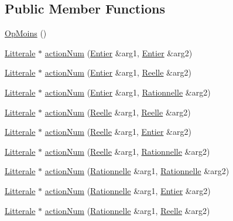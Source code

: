 \subsection*{Public Member Functions}
\begin{DoxyCompactItemize}
\item 
\hyperlink{class_op_moins_a0220e5295f19be91875616b52d28453d}{Op\+Moins} ()
\item 
\hyperlink{class_litterale}{Litterale} $\ast$ \hyperlink{class_op_moins_a852637df56ddd5a98212559db77d0ed0}{action\+Num} (\hyperlink{class_entier}{Entier} \&arg1, \hyperlink{class_entier}{Entier} \&arg2)
\item 
\hyperlink{class_litterale}{Litterale} $\ast$ \hyperlink{class_op_moins_ab478b2dc55902bdad80ea811779d8466}{action\+Num} (\hyperlink{class_entier}{Entier} \&arg1, \hyperlink{class_reelle}{Reelle} \&arg2)
\item 
\hyperlink{class_litterale}{Litterale} $\ast$ \hyperlink{class_op_moins_a03336a72ebbbb55322ba4328affc56c6}{action\+Num} (\hyperlink{class_entier}{Entier} \&arg1, \hyperlink{class_rationnelle}{Rationnelle} \&arg2)
\item 
\hyperlink{class_litterale}{Litterale} $\ast$ \hyperlink{class_op_moins_a1673d5e6a39a07dc7ba20500de52067c}{action\+Num} (\hyperlink{class_reelle}{Reelle} \&arg1, \hyperlink{class_reelle}{Reelle} \&arg2)
\item 
\hyperlink{class_litterale}{Litterale} $\ast$ \hyperlink{class_op_moins_a0217de77568e1e5bab54af01f59d9e70}{action\+Num} (\hyperlink{class_reelle}{Reelle} \&arg1, \hyperlink{class_entier}{Entier} \&arg2)
\item 
\hyperlink{class_litterale}{Litterale} $\ast$ \hyperlink{class_op_moins_a6e72db9e3a3bf594e69c0c54513cb787}{action\+Num} (\hyperlink{class_reelle}{Reelle} \&arg1, \hyperlink{class_rationnelle}{Rationnelle} \&arg2)
\item 
\hyperlink{class_litterale}{Litterale} $\ast$ \hyperlink{class_op_moins_a75cd2784ee19446e28407e703487cdab}{action\+Num} (\hyperlink{class_rationnelle}{Rationnelle} \&arg1, \hyperlink{class_rationnelle}{Rationnelle} \&arg2)
\item 
\hyperlink{class_litterale}{Litterale} $\ast$ \hyperlink{class_op_moins_a6e87da6d4cd00822289d5d02e354fff3}{action\+Num} (\hyperlink{class_rationnelle}{Rationnelle} \&arg1, \hyperlink{class_entier}{Entier} \&arg2)
\item 
\hyperlink{class_litterale}{Litterale} $\ast$ \hyperlink{class_op_moins_af41b3759848a8293a9990be2b24bee6c}{action\+Num} (\hyperlink{class_rationnelle}{Rationnelle} \&arg1, \hyperlink{class_reelle}{Reelle} \&arg2)
\end{DoxyCompactItemize}
